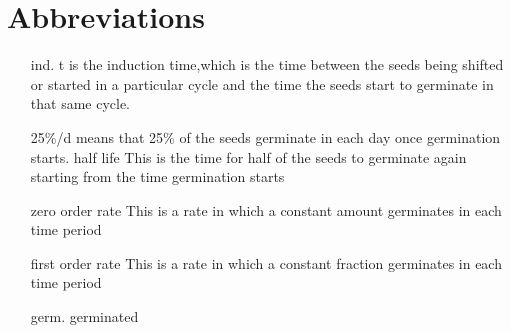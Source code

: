 \section{Abbreviations}

\begin{itemize}
\item[ind. t] is the induction time,which is the time between the seeds being shifted or
started in a particular cycle and the time the seeds start to germinate in that
same cycle.
\item[25\%/d] means that 25\% of the seeds germinate in each day once germination starts.
half life This is the time for half of the seeds to germinate again starting from the time
germination starts
\item[zero order rate] This is a rate in which a constant amount germinates in each time
period
\item[first order rate] This is a rate in which a constant fraction germinates in each time
period
\item[germ.] germinated
\end{itemize}

